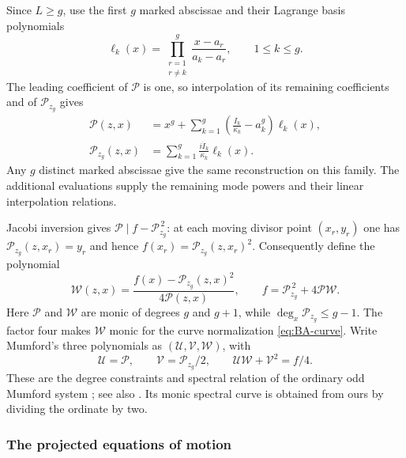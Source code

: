 Since $L\geq g$, use the first $g$ marked abscissae and their
Lagrange basis polynomials
\begin{equation}\label{eq:mumford-lagrange}
 \ell_k(x)=\prod_{\substack{r=1\\r\ne k}}^{g}
                  \frac{x-a_r}{a_k-a_r},\qquad1\leq k\leq g.
\end{equation}
The leading coefficient of $\mathcal P$ is one, so interpolation
of its remaining coefficients and of $\mathcal P_{z_g}$ gives
\begin{equation}\label{eq:mumford-reconstruction}
\begin{aligned}
 \mathcal P(z,x)
 &=x^g+\sum_{k=1}^{g}
       \left(\frac{I_k}{\kappa_k}-a_k^g\right)\ell_k(x),\\
 \mathcal P_{z_g}(z,x)
 &=\sum_{k=1}^{g}\frac{i\dot I_k}{\kappa_k}\ell_k(x).
\end{aligned}
\end{equation}
Any $g$ distinct marked abscissae give the same reconstruction on
this family. The additional evaluations supply the remaining mode
powers and their linear interpolation relations.

Jacobi inversion gives $\mathcal P\mid f-\mathcal P_{z_g}^{\,2}$:
at each moving divisor point $(x_r,y_r)$ one has
$\mathcal P_{z_g}(z,x_r)=y_r$ and hence $f(x_r)=\mathcal P_{z_g}(z,x_r)^2$.
Consequently define the polynomial
\begin{equation}\label{eq:mumford-W}
 \mathcal W(z,x)=\frac{f(x)-\mathcal P_{z_g}(z,x)^2}
                         {4\mathcal P(z,x)},\qquad
 f=\mathcal P_{z_g}^{\,2}+4\mathcal P\mathcal W.
\end{equation}
Here $\mathcal P$ and $\mathcal W$ are monic of degrees $g$ and
$g+1$, while $\deg_x\mathcal P_{z_g}\leq g-1$. The factor four
makes $\mathcal W$ monic for the curve normalization
\cref{eq:BA-curve}. Write Mumford's three polynomials as
$(\mathcal U,\mathcal V,\mathcal W)$, with
\begin{equation}\label{eq:mumford-dictionary}
 \mathcal U=\mathcal P,\qquad
 \mathcal V=\mathcal P_{z_g}/2,\qquad
 \mathcal U\mathcal W+\mathcal V^2=f/4.
\end{equation}
These are the degree constraints and spectral relation of the
ordinary odd Mumford system
\cite[Chapter~IIIa]{Mumford1984}; see also
\cite[\S3.1]{FernandesVanhaecke2001}. Its monic spectral curve is
obtained from ours by dividing the ordinate by two.

\subsubsection{The projected equations of motion}

